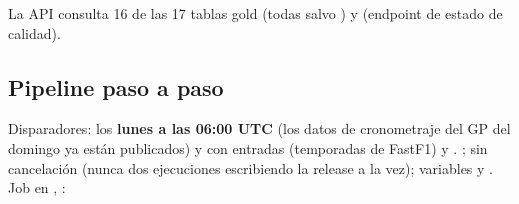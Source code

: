 La API consulta 16 de las 17 tablas gold (todas salvo ) y  (endpoint de estado de calidad).

\subsection{Pipeline  paso a paso}

Disparadores:  los \textbf{lunes a las 06:00 UTC} (los datos de cronometraje del GP del domingo ya están publicados) y  con entradas  (temporadas de FastF1) y . ;  sin cancelación (nunca dos ejecuciones escribiendo la release a la vez); variables  y . Job  en , :

